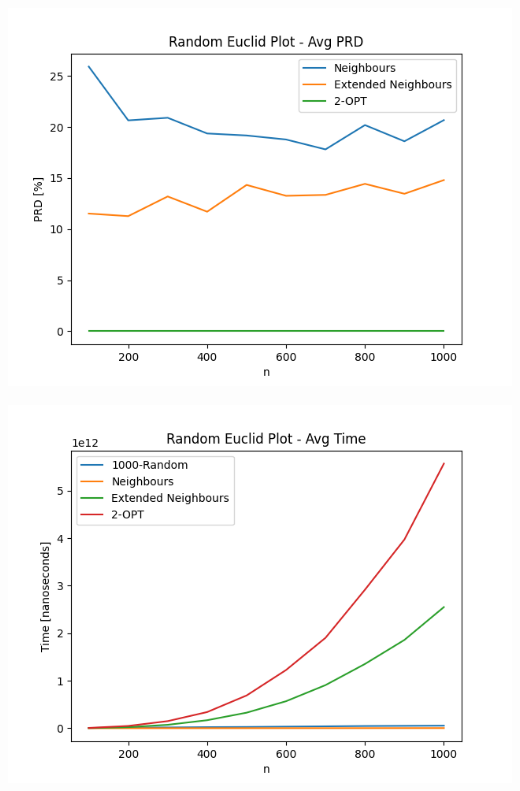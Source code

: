 \documentclass{article}
\begin{document}
\begin{center}
\includegraphics[width=\textwidth, 
                   height = 0.4\textheight, 
                   keepaspectratio]
                  {generated_euclid_avg_prd_no_krandom} 
\end{center}

\begin{center}
\includegraphics[width=\textwidth, 
                   height = 0.4\textheight, 
                   keepaspectratio]
                  {generated_euclid_avg_time} 
\end{center}
\end{document}
